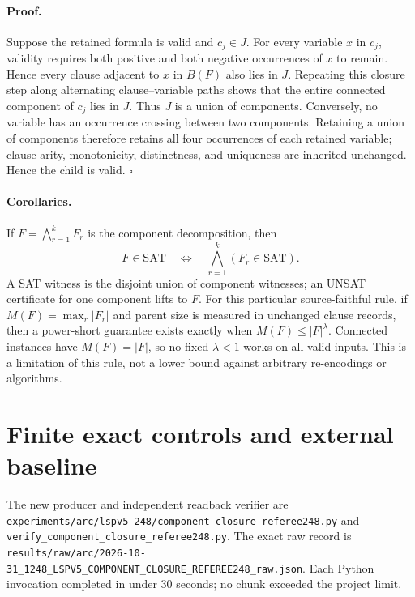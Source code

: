\documentclass[11pt]{article}
\begin{document}
\paragraph{Proof.}
Suppose the retained formula is valid and $c_j\in J$.  For every variable $x$
in $c_j$, validity requires both positive and both negative occurrences of $x$
to remain.  Hence every clause adjacent to $x$ in $B(F)$ also lies in $J$.
Repeating this closure step along alternating clause--variable paths shows that
the entire connected component of $c_j$ lies in $J$.  Thus $J$ is a union of
components.  Conversely, no variable has an occurrence crossing between two
components.  Retaining a union of components therefore retains all four
occurrences of each retained variable; clause arity, monotonicity, distinctness,
and uniqueness are inherited unchanged.  Hence the child is valid. \hfill$\square$

\paragraph{Corollaries.}
If $F=\bigwedge_{r=1}^k F_r$ is the component decomposition, then
\[
   F\in\mathrm{SAT}\quad\Longleftrightarrow\quad
   \bigwedge_{r=1}^k(F_r\in\mathrm{SAT}).
\]
A SAT witness is the disjoint union of component witnesses; an UNSAT certificate
for one component lifts to $F$.  For this particular source-faithful rule, if
$M(F)=\max_r |F_r|$ and parent size is measured in unchanged clause records,
then a power-short guarantee exists exactly when $M(F)\le |F|^\lambda$.
Connected instances have $M(F)=|F|$, so no fixed $\lambda<1$ works on all valid
inputs.  This is a limitation of this rule, not a lower bound against arbitrary
re-encodings or algorithms.

\section{Finite exact controls and external baseline}
The new producer and independent readback verifier are
\texttt{experiments/arc/lspv5\_248/component\_closure\_referee248.py} and
\texttt{verify\_component\_closure\_referee248.py}.  The exact raw record is
\texttt{results/raw/arc/2026-10-31\_1248\_LSPV5\_COMPONENT\_CLOSURE\_REFEREE248\_raw.json}.
Each Python invocation completed in under 30 seconds; no chunk exceeded the
project limit.
\end{document}
